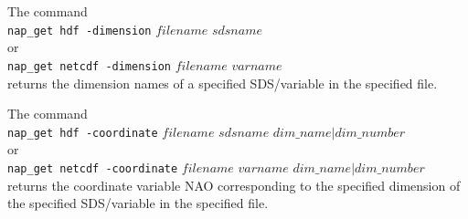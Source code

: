 The command
  \\
  \texttt{nap\_get hdf -dimension} 
  $\mathit{filename}$ $\mathit{sdsname}$
  \\or
  \\
  \texttt{nap\_get netcdf -dimension} 
  $\mathit{filename}$ $\mathit{varname}$
  \\returns the dimension names of a specified SDS/variable in the
  specified file.
  

The command
  \\
  \texttt{nap\_get hdf -coordinate} $\mathit{filename}$ $\mathit{sdsname}$ $\mathit{dim\_name}|\mathit{dim\_number}$
  \\or
  \\
  \texttt{nap\_get netcdf -coordinate} $\mathit{filename}$ $\mathit{\mathit{varname}}$ $\mathit{\mathit{dim\_name}}|\mathit{\mathit{dim\_number}}$
  \\returns the coordinate variable NAO corresponding to the
  specified dimension of the specified SDS/variable in the specified
  file.
